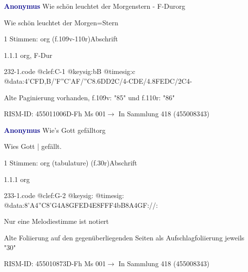 \documentclass[twocolumn, 12pt]{book}
\begin{document}
\par \vspace{16pt} \textcolor{darkblue}{\textbf{Anonymus  }}\hfillplus{\textbf{[232]}}\newline Wie schön leuchtet der Morgenstern - F-Dur\newline org
\par \begin{itshape}[f.109v, heading:] Wie schön leuchtet der Morgen=Stern\end{itshape} 
\par \textcolor{darkblue}{}  1 Stimmen: org  (f.109v-110r)\newline Abschrift
\par 1.1.1  org, F-Dur  
\begin{filecontents*}{232-1.code}
@clef:C-1
@keysig:bB
@timesig:c
@data:4'CFD,B/'F''C'AF/''C{8.6DD}2C/4-CDE/4.8FEDC/2C4-
\end{filecontents*}
\newline %
\par Alte Paginierung vorhanden, f.109v: "85" und f.110r: "86"
\par RISM-ID: 455011006\newline D-Fh  Ms 001\newline $\rightarrow$ In Sammlung 418 (455008343)
      
\par \vspace{16pt} \textcolor{darkblue}{\textbf{Anonymus  }}\hfillplus{\textbf{[233]}}\newline Wie's Gott gefällt\newline org
\par \begin{itshape}[f.30r, at left:] Wies Gott | gefällt.\end{itshape} 
\par \textcolor{darkblue}{}  1 Stimmen: org (tabulature)  (f.30r)\newline Abschrift
\par 1.1.1  org  
\begin{filecontents*}{233-1.code}
@clef:G-2
@keysig:
@timesig:
@data:8'A4''C8'G4A8G{FE}D4E{8FFF}4bB8A4GF://:
\end{filecontents*}
\newline %
\par Nur eine Melodiestimme ist notiert
\par Alte Foliierung auf den gegenüberliegenden Seiten als Aufschlagfoliierung jeweils "30"
\par RISM-ID: 455010873\newline D-Fh  Ms 001\newline $\rightarrow$ In Sammlung 418 (455008343)
      
\end{document}
